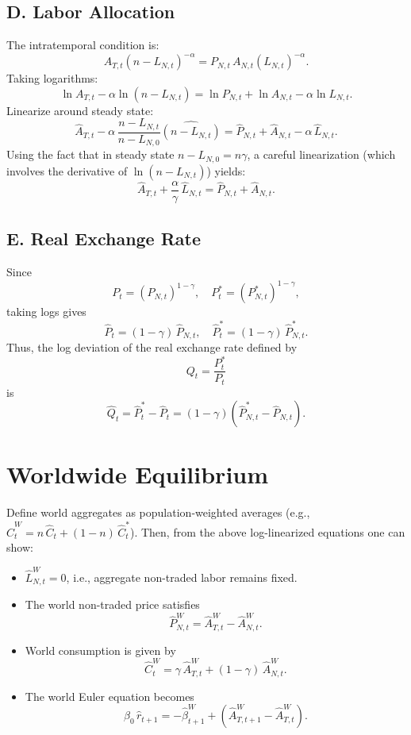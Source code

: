\documentclass[a4paper,12pt]{article} %
\theoremstyle{nonitalic}
\begin{document}
\subsection*{D. Labor Allocation}
The intratemporal condition is:
\[
A_{T,t}(n-L_{N,t})^{-\alpha} = P_{N,t}\,A_{N,t}(L_{N,t})^{-\alpha}.
\]
Taking logarithms:
\[
\ln A_{T,t} - \alpha \ln (n-L_{N,t}) = \ln P_{N,t} + \ln A_{N,t} - \alpha \ln L_{N,t}.
\]
Linearize around steady state:
\[
\hat{A}_{T,t} - \alpha\,\frac{n-L_{N,t}}{n-L_{N,0}}\hat{(n-L_{N,t})} = \hat{P}_{N,t} + \hat{A}_{N,t} - \alpha\,\hat{L}_{N,t}.
\]
Using the fact that in steady state $n-L_{N,0}=n\gamma$, a careful linearization (which involves the derivative of $\ln (n-L_{N,t})$) yields:
\[
\boxed{\hat{A}_{T,t} + \frac{\alpha}{\gamma}\,\hat{L}_{N,t} = \hat{P}_{N,t} + \hat{A}_{N,t}. \tag{7d}}
\]

\subsection*{E. Real Exchange Rate}
Since
\[
P_t=(P_{N,t})^{1-\gamma}, \quad P^*_t=(P^*_{N,t})^{1-\gamma},
\]
taking logs gives
\[
\hat{P}_t=(1-\gamma)\,\hat{P}_{N,t},\quad \hat{P}^*_t=(1-\gamma)\,\hat{P}^*_{N,t}.
\]
Thus, the log deviation of the real exchange rate defined by
\[
Q_t = \frac{P^*_t}{P_t}
\]
is
\[
\hat{Q}_t = \hat{P}^*_t-\hat{P}_t = (1-\gamma)(\hat{P}^*_{N,t}-\hat{P}_{N,t}).
\]

\section{Worldwide Equilibrium}

Define world aggregates as population-weighted averages (e.g., $ \hat{C}^W_t = n\,\hat{C}_t + (1-n)\,\hat{C}^*_t $). Then, from the above log-linearized equations one can show:
\begin{itemize}
    \item $\hat{L}^W_{N,t} = 0$, i.e., aggregate non-traded labor remains fixed.
    \item The world non-traded price satisfies
    \[
    \hat{P}^W_{N,t} = \hat{A}^W_{T,t} - \hat{A}^W_{N,t}.
    \]
    \item World consumption is given by
    \[
    \hat{C}^W_t = \gamma\,\hat{A}^W_{T,t} + (1-\gamma)\,\hat{A}^W_{N,t}.
    \]
    \item The world Euler equation becomes
    \[
    \beta_0\,\hat{r}_{t+1} = -\hat{\beta}^W_{t+1} + \left(\hat{A}^W_{T,t+1}-\hat{A}^W_{T,t}\right).
    \]
\end{itemize}
\end{document}
